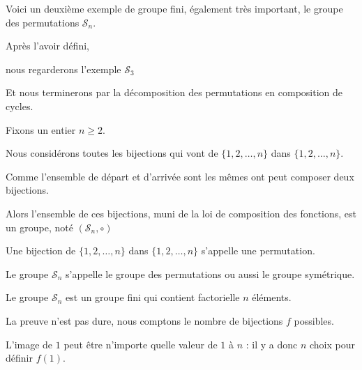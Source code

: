 







\debuttexte

\diapo

\change

Voici un deuxième exemple de groupe fini, également très important,
le groupe des permutations $\mathcal{S}_n$.

\change

Après l'avoir défini,

\change

nous regarderons l'exemple $\mathcal{S}_3$

\change

Et nous terminerons par la décomposition des permutations en 
composition de cycles.


\diapo

Fixons un entier $n\ge 2$.



Nous considérons toutes les bijections qui vont de $\{1,2,\ldots,n\}$
dans $\{1,2,\ldots,n\}$.

Comme l'ensemble de départ et d'arrivée sont les mêmes 
ont peut composer deux bijections.

Alors  l'ensemble de ces bijections, muni de la loi de composition
des fonctions, est un groupe, noté $(\mathcal{S}_n,\circ)$

\change

Une bijection de $\{1,2,\ldots,n\}$
dans $\{1,2,\ldots,n\}$ s'appelle une permutation.

Le groupe $\mathcal{S}_n$ s'appelle le groupe des permutations
ou aussi le groupe symétrique.


\diapo

Le groupe $\mathcal{S}_n$ est un groupe fini
qui contient factorielle $n$ éléments.

\change

La preuve n'est pas dure, nous comptons le nombre de bijections $f$ possibles.

L'image de $1$ peut être n'importe quelle valeur de $1$ à $n$ : il y a donc $n$
choix pour définir $f(1)$.

